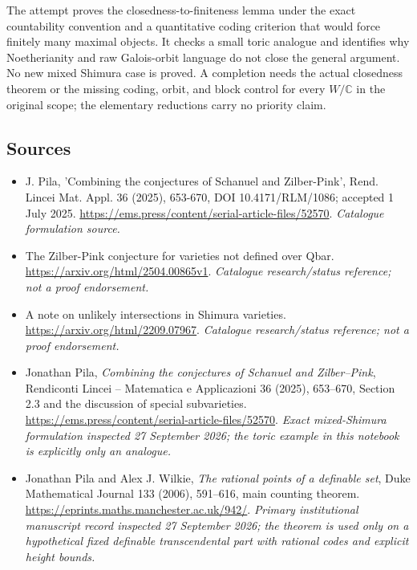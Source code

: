 \documentclass[11pt,a4paper]{article}
\numberwithin{equation}{section}
\newcommand{\C}{\mathbb{C}}
\begin{document}
The attempt proves the closedness-to-finiteness lemma under the exact
countability convention and a quantitative coding criterion that would
force finitely many maximal objects. It checks a small toric analogue and
identifies why Noetherianity and raw Galois-orbit language do not close the
general argument. No new mixed Shimura case is proved. A completion needs
the actual closedness theorem or the missing coding, orbit, and block
control for every $W/\C$ in the original scope; the elementary reductions
carry no priority claim.
\subsection{Sources}
\begin{itemize}\raggedright
\item[\textnormal{[S1]}]\hypertarget{source:30006716:1}{} J. Pila, 'Combining the conjectures of Schanuel and Zilber-Pink', Rend. Lincei Mat. Appl. 36 (2025), 653-670, DOI 10.4171/RLM/1086; accepted 1 July 2025.
\url{https://ems.press/content/serial-article-files/52570}.
{\small\textit{Catalogue formulation source.}}
\item[\textnormal{[S2]}]\hypertarget{source:30006716:2}{} The Zilber-Pink conjecture for varieties not defined over Qbar.
\url{https://arxiv.org/html/2504.00865v1}.
{\small\textit{Catalogue research/status reference; not a proof endorsement.}}
\item[\textnormal{[S3]}]\hypertarget{source:30006716:3}{} A note on unlikely intersections in Shimura varieties.
\url{https://arxiv.org/html/2209.07967}.
{\small\textit{Catalogue research/status reference; not a proof endorsement.}}
\item[\textnormal{[E1]}]\hypertarget{extra:30006716:1}{} Jonathan Pila,
\emph{Combining the conjectures of Schanuel and Zilber--Pink},
Rendiconti Lincei -- Matematica e Applicazioni 36 (2025), 653--670,
Section 2.3 and the discussion of special subvarieties.
\url{https://ems.press/content/serial-article-files/52570}.
{\small\textit{Exact mixed-Shimura formulation inspected 27 September 2026;
the toric example in this notebook is explicitly only an analogue.}}
\item[\textnormal{[E2]}]\hypertarget{extra:30006716:2}{} Jonathan Pila and
Alex J. Wilkie, \emph{The rational points of a definable set},
Duke Mathematical Journal 133 (2006), 591--616, main counting theorem.
\url{https://eprints.maths.manchester.ac.uk/942/}.
{\small\textit{Primary institutional manuscript record inspected
27 September 2026; the theorem is used only on a hypothetical fixed
definable transcendental part with rational codes and explicit height bounds.}}
\end{itemize}
\end{document}
